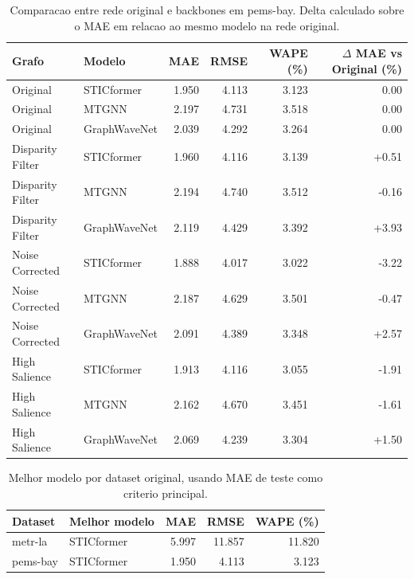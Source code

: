 \begin{table}[ht]
\centering
\caption{Comparacao entre rede original e backbones em pems-bay. Delta calculado sobre o MAE em relacao ao mesmo modelo na rede original.}
\label{tab:pems-bay-original-backbones}
\begin{tabular}{llrrrr}
\toprule
Grafo & Modelo & MAE & RMSE & WAPE (\%) & $\Delta$ MAE vs Original (\%) \\
\midrule
Original & STICformer & 1.950 & 4.113 & 3.123 & 0.00 \\
Original & MTGNN & 2.197 & 4.731 & 3.518 & 0.00 \\
Original & GraphWaveNet & 2.039 & 4.292 & 3.264 & 0.00 \\
Disparity Filter & STICformer & 1.960 & 4.116 & 3.139 & +0.51 \\
Disparity Filter & MTGNN & 2.194 & 4.740 & 3.512 & -0.16 \\
Disparity Filter & GraphWaveNet & 2.119 & 4.429 & 3.392 & +3.93 \\
Noise Corrected & STICformer & 1.888 & 4.017 & 3.022 & -3.22 \\
Noise Corrected & MTGNN & 2.187 & 4.629 & 3.501 & -0.47 \\
Noise Corrected & GraphWaveNet & 2.091 & 4.389 & 3.348 & +2.57 \\
High Salience & STICformer & 1.913 & 4.116 & 3.055 & -1.91 \\
High Salience & MTGNN & 2.162 & 4.670 & 3.451 & -1.61 \\
High Salience & GraphWaveNet & 2.069 & 4.239 & 3.304 & +1.50 \\
\bottomrule
\end{tabular}
\end{table}

\begin{table}[ht]
\centering
\caption{Melhor modelo por dataset original, usando MAE de teste como criterio principal.}
\label{tab:best-models-original}
\begin{tabular}{llrrr}
\toprule
Dataset & Melhor modelo & MAE & RMSE & WAPE (\%) \\
\midrule
metr-la & STICformer & 5.997 & 11.857 & 11.820 \\
pems-bay & STICformer & 1.950 & 4.113 & 3.123 \\
\bottomrule
\end{tabular}
\end{table}

